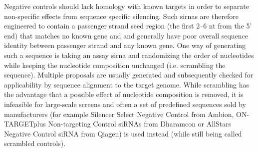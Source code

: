 Negative controls should lack homology with known targets in order to separate non-specific effects from sequence specific silencing. Such \glspl{sirna} are therefore engineered to contain a passenger strand seed region (the first 2--6 nt from the 5' end) that matches no known gene and and generally have poor overall sequence identity between passenger strand and any known gene. One way of generating such a sequence is taking an assay \gls{sirna} and randomizing the order of nucleotides while keeping the nucleotide composition unchanged (i.e. scrambling the sequence). Multiple proposals are usually generated and subsequently checked for applicability by sequence alignment to the target genome. While scrambling has the advantage that a possible effect of nucleotide composition is removed, it is infeasible for large-scale screens and often a set of predefined sequences sold by manufacturers (for example Silencer Select Negative Control from Ambion, ON-TARGETplus Non-targeting Control siRNAs from Dharamcon or AllStars Negative Control siRNA from Qiagen) is used instead (while still being called scrambled controls). 

